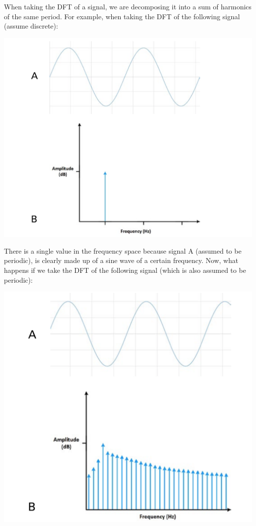 \documentclass[a4paper]{article}
\numberwithin{equation}{section}
\begin{document}
When taking the DFT of a signal, we are decomposing it into a sum of harmonics of the same period. For example, when taking the DFT of the following signal (assume discrete):
\begin{center}
\includegraphics[scale=0.45]{int_periods.png}
\end{center}
There is a single value in the frequency space because signal A (assumed to be periodic), is clearly made up of a sine wave of a certain frequency. Now, what happens if we take the DFT of the following signal (which is also assumed to be periodic):
\begin{center}
\includegraphics[scale=0.45]{non_int_periods.png}
\end{center}
\end{document}
